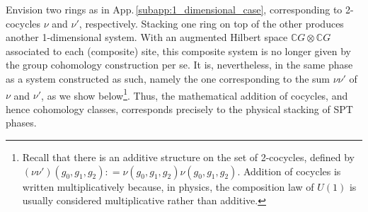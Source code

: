\documentclass[sort&compress]{elsarticle}
\theoremstyle{theoremstyle}
\theoremstyle{framedtheoremstyle}
\theoremstyle{definitionstyle}
\theoremstyle{definitionstyle}
\theoremstyle{definitionstyle}
\theoremstyle{definitionstyle}
\theoremstyle{nameddefinitionstyle}
\theoremstyle{framednameddefinitionstyle}
\theoremstyle{proofstyle}
\theoremstyle{definitionstyle}
\newcommand{\CCC}{\mathbb{C}}
\newcommand{\coloneq}{\mathrel{\mathop:}=}
\newcommand{\paren}[1]{\left( #1 \right)}
\begin{document}
\begin{appendices}
Envision two rings as in App.\,\ref{subapp:1_dimensional_case}, corresponding to 2-cocycles $\nu$ and $\nu'$, respectively. Stacking one ring on top of the other produces another 1-dimensional system. With an augmented Hilbert space $\CCC G \otimes \CCC G$ associated to each (composite) site, this composite system is no longer given by the group cohomology construction per se. It is, nevertheless, in the same phase as a system constructed as such, namely the one corresponding to the sum $\nu \nu'$ of $\nu$ and $\nu'$, as we show below\footnote{%
Recall that there is an additive structure on the set of 2-cocycles, defined by $\paren{\nu\nu'}(g_0, g_1, g_2) \coloneq \nu(g_0,g_1,g_2) \nu(g_0,g_1,g_2)$. Addition of cocycles is written multiplicatively because, in physics, the composition law of $U(1)$ is usually considered multiplicative rather than additive.}.
Thus, the mathematical addition of cocycles, and hence cohomology classes, corresponds precisely to the physical stacking of SPT phases.


\end{appendices}
\end{document}
